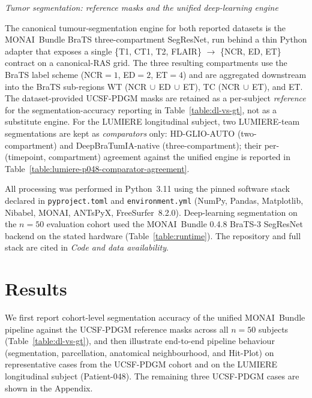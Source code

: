 \documentclass[a4paper,11pt,leqno]{article}
\begin{document}
\vspace{2mm}


\noindent \emph{Tumor segmentation: reference masks and the unified deep-learning engine}

\vspace{2mm}

The canonical tumour-segmentation engine for both reported
datasets is the MONAI~Bundle BraTS three-compartment SegResNet, run
behind a thin Python adapter that exposes a single
\{T1, CT1, T2, FLAIR\} $\rightarrow$ \{NCR, ED, ET\} contract on a
canonical-RAS grid. The three resulting compartments use the BraTS
label scheme (NCR$=1$, ED$=2$, ET$=4$) and are aggregated downstream
into the BraTS sub-regions WT (NCR$\,\cup\,$ED$\,\cup\,$ET),
TC (NCR$\,\cup\,$ET), and ET. The dataset-provided UCSF-PDGM masks
are retained as a per-subject \emph{reference} for the
segmentation-accuracy reporting in Table~\ref{table:dl-vs-gt}, not
as a substitute engine. For the LUMIERE longitudinal subject, two
LUMIERE-team segmentations are kept as \emph{comparators} only:
HD-GLIO-AUTO (two-compartment) and
DeepBraTumIA-native (three-compartment); their per-(timepoint,
compartment) agreement against the unified engine is reported in
Table~\ref{table:lumiere-p048-comparator-agreement}.\\

\vspace{1mm}

All processing was performed in Python~3.11 using the pinned
software stack declared in \texttt{pyproject.toml} and
\texttt{environment.yml} (NumPy, Pandas, Matplotlib, Nibabel, MONAI,
ANTsPyX, FreeSurfer~8.2.0). Deep-learning segmentation on the
$n=50$ evaluation cohort used the MONAI~Bundle 0.4.8 BraTS-3 SegResNet
backend on the stated hardware (Table~\ref{table:runtime}). The
repository and full stack are cited in \emph{Code and data availability}.



\newpage

\section{Results}

\vspace{2mm}

We first report cohort-level
segmentation accuracy of the unified MONAI~Bundle pipeline against
the UCSF-PDGM reference masks across all $n=50$ subjects
(Table~\ref{table:dl-vs-gt}), and then illustrate end-to-end
pipeline behaviour (segmentation, parcellation, anatomical
neighbourhood, and Hit-Plot) on representative cases from the
UCSF-PDGM cohort and on the LUMIERE longitudinal subject
(Patient-048). The remaining three UCSF-PDGM cases are shown in
the Appendix.
\end{document}
